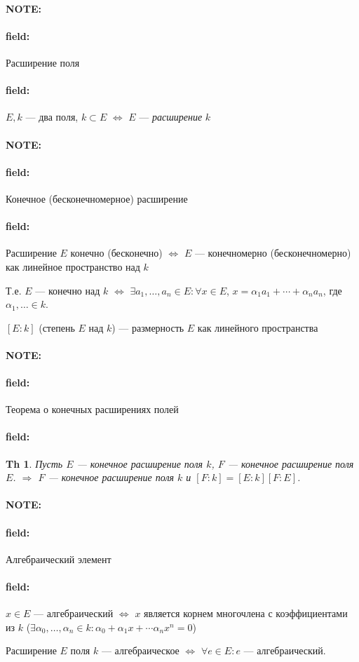 \documentclass[12pt]{article}
\newenvironment{note}{\paragraph{NOTE:}}{}
\newenvironment{field}{\paragraph{field:}}{}
\newtheorem{theorem}{Th}
\begin{document}
\begin{note}
  \begin{field}
    Расширение поля
  \end{field}
  \begin{field}
    $E, k$ --- два поля,
    $k \subset E$
    $\Leftrightarrow$
    $E$ --- \emph{расширение} $k$
  \end{field}
\end{note}

\begin{note}
  \begin{field}
    Конечное (бесконечномерное) расширение
  \end{field}
  \begin{field}
    Расширение $E$ конечно (бесконечно) $\Leftrightarrow$ $E$ --- конечномерно
    (бесконечномерно) как линейное пространство над $k$

    Т.е. $E$ --- конечно над $k$
    $\Leftrightarrow$
    $\exists a_{1}, \ldots, a_{n} \in E : \forall x \in E$,
    $x = \alpha_{1}a_{1} + \cdots + \alpha_{n} a_{n}$,
    где $\alpha_{1}, \ldots \in k$.

    $[E : k]$ (степень $E$ над $k$) ---
    размерность $E$ как линейного пространства
  \end{field}
\end{note}

\begin{note}
  \begin{field}
    Теорема о конечных расширениях полей
  \end{field}
  \begin{field}
    \begin{theorem}
      Пусть $E$ --- конечное расширение поля $k$,
      $F$ --- конечное расширение поля $E$.
      $\Rightarrow$
      $F$ --- конечное расширение поля $k$
      и $[F : k] = [E : k][F : E]$.
    \end{theorem}
  \end{field}
\end{note}

\begin{note}
  \begin{field}
    Алгебраический элемент
  \end{field}
  \begin{field}
    $x \in E$ --- алгебраический
    $\Leftrightarrow$
    $x$ является корнем многочлена с коэффициентами из $k$
    ($\exists \alpha_{0}, \ldots, \alpha_{n} \in k :
    \alpha_{0} + \alpha_{1}x + \cdots \alpha_{n}x^{n} = 0$)

    Расширение $E$ поля $k$ --- алгебраическое
    $\Leftrightarrow$
    $\forall e \in E : e$ --- алгебраический.
  \end{field}
\end{note}
\end{document}
